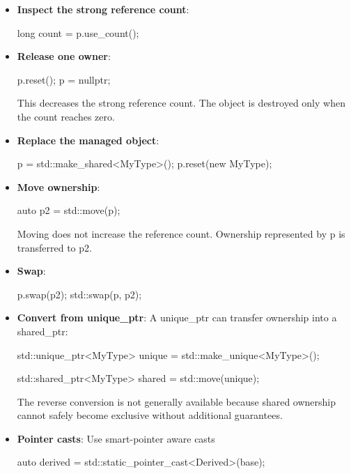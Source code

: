\documentclass{report}
\begin{document}
\begin{itemize}
\begin{itemize}
\begin{cppcode}
                    \end{cppcode}
                \item \textbf{Inspect the strong reference count}:
                    \bigbreak \noindent 
                    \begin{cppcode}
                    long count = p.use_count();
                    \end{cppcode}
                \item \textbf{Release one owner}:
                    \bigbreak \noindent 
                    \begin{cppcode}
                        p.reset();
                        p = nullptr;
                    \end{cppcode}
                    \bigbreak \noindent 
                    This decreases the strong reference count. The object is destroyed only when the count reaches zero.
                \item \textbf{Replace the managed object}:
                    \bigbreak \noindent 
                    \begin{cppcode}
                    p = std::make_shared<MyType>();
                    p.reset(new MyType);
                    \end{cppcode}
                \item \textbf{Move ownership}: 
                    \bigbreak \noindent 
                    \begin{cppcode}
                    auto p2 = std::move(p);
                    \end{cppcode}
                    \bigbreak \noindent 
                    Moving does not increase the reference count. Ownership represented by p is transferred to p2.
                \item \textbf{Swap}:
                    \bigbreak \noindent 
                    \begin{cppcode}
                        p.swap(p2);
                        std::swap(p, p2);
                    \end{cppcode}
                \item \textbf{Convert from unique\_ptr}: A unique\_ptr can transfer ownership into a shared\_ptr:
                    \bigbreak \noindent 
                    \begin{cppcode}
                        std::unique_ptr<MyType> unique =
                        std::make_unique<MyType>();

                        std::shared_ptr<MyType> shared = std::move(unique);
                    \end{cppcode}
                    \bigbreak \noindent 
                    The reverse conversion is not generally available because shared ownership cannot safely become exclusive without additional guarantees.
                \item \textbf{Pointer casts}: Use smart-pointer aware casts
                    \bigbreak \noindent 
                    \begin{cppcode}
                        auto derived =
                        std::static_pointer_cast<Derived>(base);


\end{cppcode}
\end{itemize}
\end{itemize}
\end{document}
